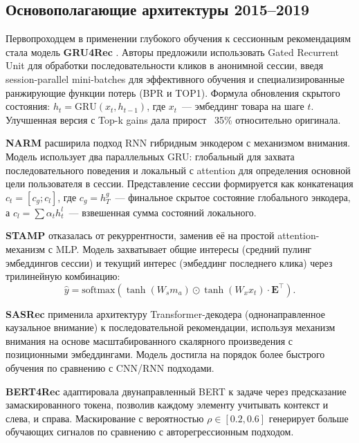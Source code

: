 \subsection{Основополагающие архитектуры 2015–2019}
\label{subsec:ch1:foundational}

Первопроходцем в применении глубокого обучения к сессионным рекомендациям стала модель \textbf{GRU4Rec} \cite{hidasi2016gru4rec}. 
Авторы предложили использовать Gated Recurrent Unit для обработки последовательности кликов в анонимной сессии, введя session-parallel mini-batches для эффективного обучения и специализированные ранжирующие функции потерь (BPR и TOP1). 
Формула обновления скрытого состояния: $h_t = \text{GRU}(x_t, h_{t-1})$, где $x_t$~--- эмбеддинг товара на шаге $t$. 
Улучшенная версия с Top-k gains \cite{hidasi2018improved} дала прирост ~35\% относительно оригинала.

\textbf{NARM} \cite{li2017narm} расширила подход RNN гибридным энкодером с механизмом внимания. 
Модель использует два параллельных GRU: глобальный для захвата последовательного поведения и локальный с attention для определения основной цели пользователя в сессии. 
Представление сессии формируется как конкатенация $c_t = [c_g; c_l]$, где $c_g = h_T^g$~--- финальное скрытое состояние глобального энкодера, а $c_l = \sum \alpha_t h_t^l$~--- взвешенная сумма состояний локального.

\textbf{STAMP} \cite{liu2018stamp} отказалась от рекуррентности, заменив её на простой attention-механизм с MLP. 
Модель захватывает общие интересы (средний пулинг эмбеддингов сессии) и текущий интерес (эмбеддинг последнего клика) через трилинейную комбинацию:
\begin{equation}
    \hat{y} = \text{softmax}\!\left(\tanh(W_s m_a) \odot \tanh(W_x x_t) \cdot \mathbf{E}^\top\right).
\end{equation}

\textbf{SASRec} \cite{kang2018sasrec} применила архитектуру Transformer-декодера (однонаправленное каузальное внимание) к последовательной рекомендации, используя механизм внимания на основе масштабированного скалярного произведения с позиционными эмбеддингами. 
Модель достигла на порядок более быстрого обучения по сравнению с CNN/RNN подходами.

\textbf{BERT4Rec} \cite{sun2019bert4rec} адаптировала двунаправленный BERT к задаче через предсказание замаскированного токена, позволив каждому элементу учитывать контекст и слева, и справа. 
Маскирование с вероятностью $\rho \in [0.2, 0.6]$ генерирует больше обучающих сигналов по сравнению с авторегрессионным подходом.

